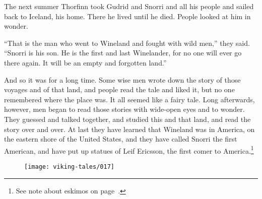 The next summer Thorfinn took Gudrid and Snorri and all his people and
sailed back to Iceland, his home. There he lived until he died. People
looked at him in wonder.

``That is the man who went to Wineland and fought with wild men,'' they
said. ``Snorri is his son. He is the first and last Winelander, for no
one will ever go there again. It will be an empty and forgotten land.''

And so it was for a long time. Some wise men wrote down the story of
those voyages and of that land, and people read the tale and liked it,
but no one remembered where the place was. It all seemed like a fairy
tale. Long afterwards, however, men began to read those stories with
wide-open eyes and to wonder. They guessed and talked together, and
studied this and that land, and read the story over and over. At last
they have learned that Wineland was in America, on the eastern shore of
the United States, and they have called Snorri the first American, and
have put up statues of Leif Ericsson, the first comer to
America.\footnote{See note about eskimos on page~\pageref{eskimos}.}

\begin{figure}[hb]
    \centering
    \vskip8pt
    \texttt{[image: viking-tales/017]}
\end{figure}
